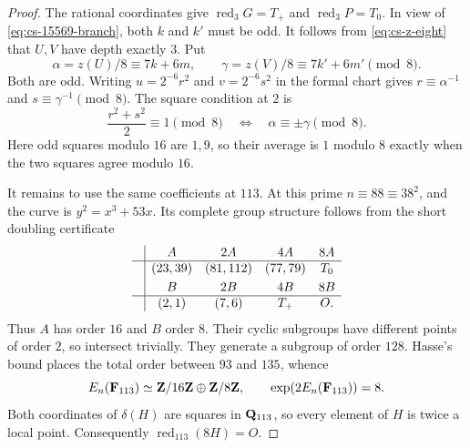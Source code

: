 \begin{proof}
The rational coordinates give $\operatorname{red}_3G=T_+$ and
$\operatorname{red}_3P=T_0$.  In view of
\eqref{eq:cs-15569-branch}, both $k$ and $k'$ must be odd.  It follows
from \eqref{eq:cs-z-eight} that $U,V$ have depth exactly $3$.  Put
\[
 \alpha=z(U)/8\equiv7k+6m,\qquad
 \gamma=z(V)/8\equiv7k'+6m'\pmod8.
\]
Both are odd.  Writing $u=2^{-6}r^2$ and $v=2^{-6}s^2$ in the formal
chart gives $r\equiv\alpha^{-1}$ and
$s\equiv\gamma^{-1}\pmod8$.  The square condition at $2$ is
\begin{equation}\label{eq:cs-eight-match}
 \frac{r^2+s^2}{2}\equiv1\pmod8
 \quad\Longleftrightarrow\quad
 \alpha\equiv\pm\gamma\pmod8.
\end{equation}
Here odd squares modulo $16$ are $1,9$, so their average is $1$ modulo
$8$ exactly when the two squares agree modulo $16$.

It remains to use the same coefficients at $113$.  At this prime
$n\equiv88\equiv38^2$, and the curve is $y^2=x^3+53x$.  Its complete
group structure follows from the short doubling certificate
\begin{equation}\label{eq:cs-f113-certificate}
\begin{array}{c|cccc}
 &A&2A&4A&8A\\ \hline
 &(23,39)&(81,112)&(77,79)&T_0\\[1mm]
 &B&2B&4B&8B\\ \hline
 &(2,1)&(7,6)&T_+&O.
\end{array}
\end{equation}
Thus $A$ has order $16$ and $B$ order $8$.  Their cyclic subgroups have
different points of order $2$, so intersect trivially.  They generate a
subgroup of order $128$.  Hasse's bound places the total order between
$93$ and $135$, whence
\[
 E_n(\mathbf F_{113})\simeq\mathbf Z/16\mathbf Z\oplus\mathbf Z/8\mathbf Z,
 \qquad \exp(2E_n(\mathbf F_{113}))=8.
\]
Both coordinates of $\delta(H)$ are squares in $\mathbf Q_{113}$, so every
element of $H$ is twice a local point.  Consequently
$\operatorname{red}_{113}(8H)=O$.


\end{proof}
